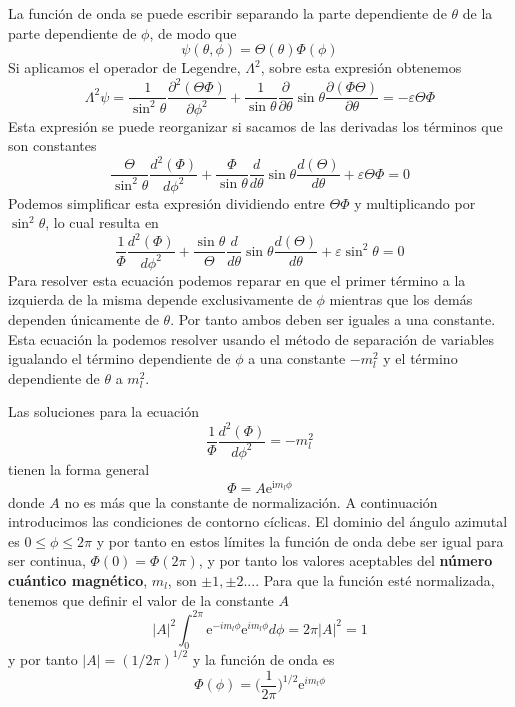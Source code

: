 \documentclass{tufte-handout}
\begin{document}
La función de onda se puede escribir separando la parte
dependiente de $\theta$ de la parte dependiente de $\phi$,
de modo que
\begin{equation}
    \psi(\theta, \phi)=\Theta(\theta)\Phi(\phi)
\end{equation}
Si aplicamos el operador de Legendre, $\Lambda^2$, sobre
esta expresión obtenemos
\begin{equation}
    \Lambda^2\psi=\frac{1}{\sin^2\theta}\frac{\partial^2(\Theta\Phi)}{\partial\phi^2}+
    \frac{1}{\sin\theta}\frac{\partial}{\partial\theta}\sin\theta\frac{\partial(\Phi\Theta)}{\partial\theta}=-\varepsilon\Theta\Phi
\end{equation}
Esta expresión se puede reorganizar si sacamos de las 
derivadas los términos que son constantes 
\begin{equation}
    \frac{\Theta}{\sin^2\theta}\frac{d^2(\Phi)}{d\phi^2} + 
    \frac{\Phi}{\sin\theta}\frac{d}{d\theta}\sin\theta\frac{d(\Theta)}{d\theta}+
    \varepsilon\Theta\Phi=0
\end{equation}
Podemos simplificar esta expresión dividiendo entre $\Theta\Phi$ y 
multiplicando por $\sin^2\theta$, lo cual resulta en
\begin{equation}
    \frac{1}{\Phi}\frac{d^2(\Phi)}{d\phi^2} + 
    \frac{\sin\theta}{\Theta}\frac{d}{d\theta}\sin\theta\frac{d(\Theta)}{d\theta}+
    \varepsilon\sin^2\theta=0\label{eq:rotor}
\end{equation}
Para resolver esta ecuación podemos reparar en que el
primer término a la izquierda de la misma depende 
exclusivamente de $\phi$ mientras que los demás 
dependen únicamente de $\theta$. Por tanto ambos deben
ser iguales a una constante. Esta ecuación la podemos
resolver usando el método de separación de variables
igualando el término dependiente de $\phi$ a una constante
$-m^2_l$ y el término dependiente de $\theta$ a $m^2_l$.

Las soluciones para la ecuación 
\begin{equation}
    \frac{1}{\Phi}\frac{d^2(\Phi)}{d\phi^2}=-m^2_l
\end{equation}
tienen la forma general
\begin{equation}
    \Phi=A\mathrm{e}^{\mathrm{i}m_l\phi}
\end{equation}
donde $A$ no es más que la constante de normalización. A 
continuación introducimos las condiciones de contorno cíclicas.
El dominio del ángulo azimutal es $0\leq \phi\leq2\pi$
y por tanto en estos límites la función de onda debe ser
igual para ser continua, $\Phi(0)=\Phi(2\pi)$, y por tanto
los valores aceptables del \textbf{número cuántico magnético},
$m_l$, son $\pm 1,\pm 2...$. Para que la función esté
normalizada, tenemos que definir el valor de
la constante $A$
\begin{equation}
    |A|^2\int_0^{2\pi}\mathrm{e}^{-im_l\phi}\mathrm{e}^{im_l\phi}d\phi=
    2\pi|A|^2=1
\end{equation}
y por tanto $|A|=(1/2\pi)^{1/2}$ y la función de onda es
\begin{equation}
    \Phi(\phi)=\bigg(\frac{1}{2\pi}\bigg)^{1/2}\mathrm{e}^{im_l\phi}
\end{equation}
\end{document}
